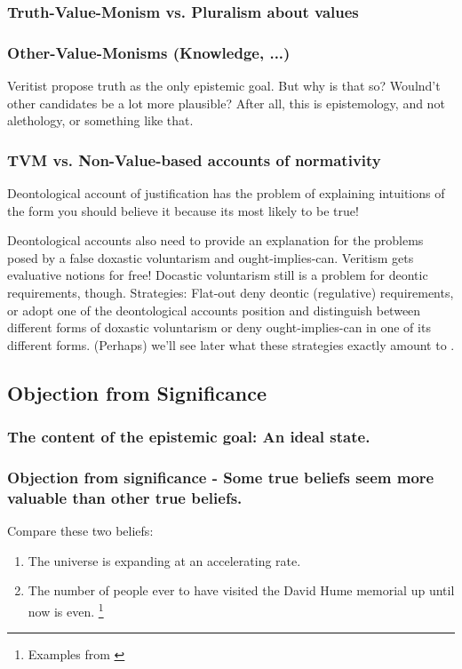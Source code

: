 \documentclass[12pt,numbers=noenddot]{scrartcl}
\begin{document}
    \subsubsection{ Truth-Value-Monism vs. Pluralism about values }
    \subsubsection{ Other-Value-Monisms (Knowledge, ...) }
    Veritist propose truth as the only epistemic goal. But why is that so? Woulnd't other candidates be a lot more plausible? After all, this is epistemology, and not alethology, or something like that.

\subsubsection{ TVM vs. Non-Value-based accounts of normativity }
    Deontological account of justification has the problem of explaining intuitions of the form you should believe it because its most likely to be true!

    Deontological accounts also need to provide an explanation for the problems posed by a false doxastic voluntarism and ought-implies-can. Veritism gets evaluative notions for free! Docastic voluntarism still is a problem for deontic requirements, though. Strategies: Flat-out deny deontic (regulative) requirements, or adopt one of the deontological accounts position and distinguish between different forms of doxastic voluntarism or deny ought-implies-can in one of its different forms. (Perhaps) we'll see later what these strategies exactly amount to .

\subsection{Objection from Significance}
    \subsubsection{ The content of the epistemic goal: An ideal state.}
    \subsubsection{ Objection from significance - Some true beliefs seem more valuable than other true beliefs.}

    Compare these two beliefs:
    \begin{enumerate}
        \item The universe is expanding at an accelerating rate.
        \item The number of people ever to have visited the David Hume memorial up until now is even. \footnote{Examples from \textcite{Ahlstrom-Vij2013}}
    \end{enumerate}
\end{document}
